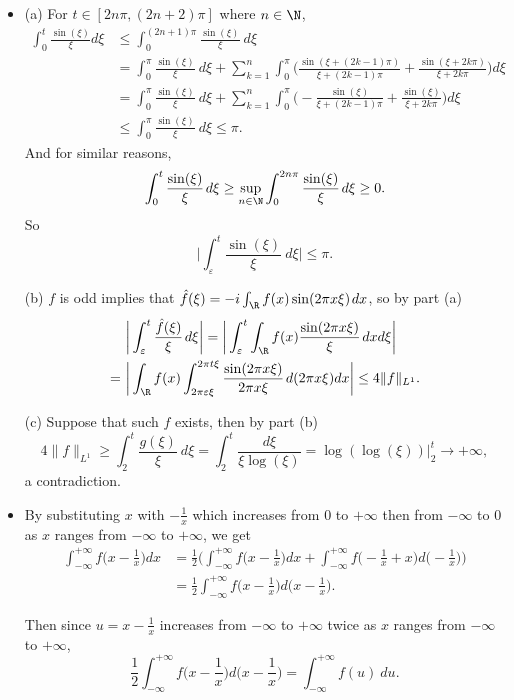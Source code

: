 \begin{itemize}
\item[2.2.9]
(a) For $t\in[2n\pi,(2n+2)\pi]$ where $n\in\N$,
\begin{align*}
\int_0^t\frac{\sin(\xi)}{\xi}d\xi
&\leq\int_0^{(2n+1)\pi}\frac{\sin(\xi)}{\xi}\>d\xi\\
&=\int_0^{\pi}\frac{\sin(\xi)}{\xi}\>d\xi+\sum_{k=1}^{n}\int_0^{\pi}\bigg(\frac{\sin(\xi+(2k-1)\pi)}{\xi+(2k-1)\pi}
+\frac{\sin(\xi+2k\pi)}{\xi+2k\pi}\bigg)d\xi\\
&=\int_0^{\pi}\frac{\sin(\xi)}{\xi}\>d\xi+\sum_{k=1}^{n}\int_0^{\pi}\bigg(\!-\frac{\sin(\xi)}{\xi+(2k-1)\pi}+\frac{\sin(\xi)}{\xi+2k\pi}\bigg)d\xi\\
&\leq\int_0^{\pi}\frac{\sin(\xi)}{\xi}\>d\xi\leq\pi.
\end{align*}
And for similar reasons, 
$$\int_0^t\frac{\sin(\xi)}{\xi}\>d\xi
\geq\sup_{n\in\N}\int_0^{2n\pi}\frac{\sin(\xi)}{\xi}\>d\xi\geq0.$$
So $$\bigg|\int_\varepsilon^t \frac{\sin(\xi)}{\xi}\>d\xi\bigg|\leq\pi.$$

(b) $f$ is odd implies that $\hat{f}(\xi)=-i\int_\R f(x)\sin(2\pi x\xi)\>dx$,
so by part (a)
\begin{align*}
    &\bigg|\int_\varepsilon^t\frac{\hat{f}(\xi)}{\xi}\>d\xi\bigg|
    =\bigg|\int_\varepsilon^t\int_\R f(x)\frac{\sin(2\pi x\xi)}{\xi}\>dxd\xi\bigg|\\
    =\ &\bigg|\int_\R f(x)\int_{2\pi\varepsilon\xi}^{2\pi t\xi} \frac{\sin(2\pi x\xi)}{2\pi x\xi}\>d(2\pi x\xi) dx\bigg| \leq 4\|f\|_{L^1}.
\end{align*}

(c) Suppose that such $f$ exists,
then by part (b) $$4\|f\|_{L^1}\geq\int_2^t\frac{g(\xi)}{\xi}\>d\xi
=\int_2^t\frac{d\xi}{\xi\log(\xi)}
=\log(\log(\xi))\big|_2^t\rightarrow+\infty,$$ a contradiction.

\item[2.2.10]

By substituting $x$ with $-\frac{1}{x}$ which increases from 0 to $+\infty$ 
then from $-\infty$ to $0$ as $x$ ranges from $-\infty$ to $+\infty$, we get
\begin{align*}
    \int_{-\infty}^{+\infty}f\Big(x-\frac{1}{x}\Big)dx
    &=\frac{1}{2}\bigg(\int_{-\infty}^{+\infty}f\Big(x-\frac{1}{x}\Big)dx
    +\int_{-\infty}^{+\infty}f\Big(\!-\frac{1}{x}+x\Big)d\Big(\!-\frac{1}{x}\Big)\bigg)\\
    &=\frac{1}{2}\int_{-\infty}^{+\infty}f\Big(x-\frac{1}{x}\Big)d\Big(x-\frac{1}{x}\Big).
\end{align*}

Then since $u=x-\frac{1}{x}$ increases from $-\infty$ to $+\infty$ twice 
as $x$ ranges from $-\infty$ to $+\infty$, 
$$\frac{1}{2}\int_{-\infty}^{+\infty}f\Big(x-\frac{1}{x}\Big)d\Big(x-\frac{1}{x}\Big)=\int_{-\infty}^{+\infty}f(u)\>du.$$


\end{itemize}
